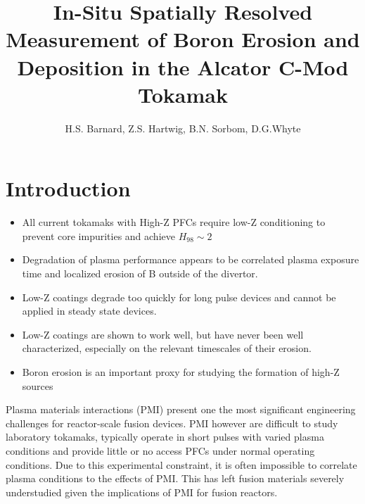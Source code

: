 \documentclass[11pt,a4paper,twocolumn]{article}
\author{H.S. Barnard, Z.S. Hartwig, B.N. Sorbom, D.G.Whyte}
\title{In-Situ Spatially Resolved Measurement of Boron Erosion and Deposition in the Alcator C-Mod Tokamak}
\begin{document}
\maketitle
{}

\section{Introduction}
\begin{itemize}
	\item All current tokamaks with High-Z PFCs require low-Z conditioning to prevent core impurities and achieve $H_{98}\sim 2$
	\item Degradation of plasma performance appears to be correlated plasma exposure time and localized erosion of B outside of the divertor.
	\item Low-Z coatings degrade too quickly for long pulse devices and cannot be applied in steady state devices.
	\item Low-Z coatings are shown to work well, but have never been well characterized, especially on the relevant timescales of their erosion.
	\item Boron erosion is an important proxy for studying the formation of high-Z sources 
\end{itemize}

Plasma materials interactions (PMI) present one the most significant engineering challenges for reactor-scale fusion devices.  PMI however are difficult to study laboratory tokamaks, typically operate in short pulses with varied plasma conditions and provide little or no access PFCs under normal operating conditions.  Due to this experimental constraint, it is often impossible to correlate plasma conditions to the effects of PMI.  This has left fusion materials severely understudied given the implications of PMI for fusion reactors.  %

\end{document}
